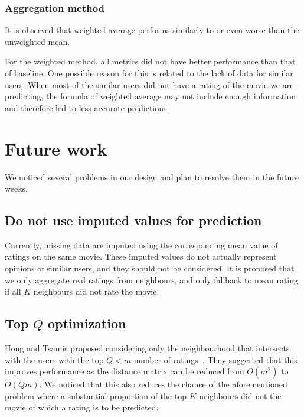 \documentclass[final]{cvpr}
\begin{document}
\subsubsection{Aggregation method}
It is observed that weighted average performs similarly to or even worse than the unweighted mean.

For the weighted method, all metrics did not have better performance than that of baseline. One possible reason for this is related to the lack of data for similar users. When most of the similar users did not have a rating of the movie we are predicting, the formula of weighted average may not include enough information and therefore led to less accurate predictions.

\section{Future work}
We noticed several problems in our design and plan to resolve them in the future weeks.

\subsection{Do not use imputed values for prediction}
Currently, missing data are imputed using the corresponding mean value of ratings on the same movie.
These imputed values do not actually represent opinions of similar users,
and they should not be considered.
It is proposed that we only aggregate real ratings from neighbours,
and only fallback to mean rating if all $K$ neighbours did not rate the movie.

\subsection{Top $Q$ optimization}
Hong and Tsamis proposed considering only the neighbourhood that
intersects with the users with the top $Q < m$ number of ratings~\cite{Alpher01}.
They suggested that this improves performance as
the distance matrix can be reduced from $O(m^2)$ to $O(Qm)$.
We noticed that this also reduces the chance of the aforementioned problem
where a substantial proportion of the top $K$ neighbours did not the movie
of which a rating is to be predicted.

{\small
	
	
}
\end{document}
